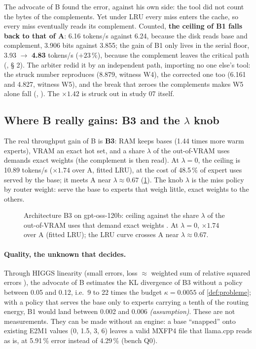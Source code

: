 The advocate of B found the error, against his own side: the tool did not count the bytes of the complements. Yet under LRU every miss enters the cache, so every miss eventually reads its complement. Counted, \textbf{the ceiling of B1 falls back to that of A}: 6.16 tokens/s against 6.24, because the disk reads base and complement, 3.906 bits against 3.855; the gain of B1 only lives in the serial floor, 3.93 $\to$ \textbf{4.83} tokens/s ($+23\,\%$), because the complement leaves the critical path \calc{} (, § 2). The arbiter redid it by an independent path, importing no one else's tool: the struck number reproduces (8.879, witness W4), the corrected one too (6.161 and 4.827, witness W5), and the break that zeroes the complements makes W5 alone fall \calc{} (, ). The $\times 1.42$ is struck out in study 07 itself.

\subsection{Where B really gains: B3 and the \texorpdfstring{$\lambda$}{lambda} knob}

The real throughput gain of B is \textbf{B3}: RAM keeps bases (1.44 times more warm experts), VRAM an exact hot set, and a share $\lambda$ of the out-of-VRAM uses demands exact weights (the complement is then read). At $\lambda = 0$, the ceiling is 10.89 tokens/s ($\times 1.74$ over A, fitted LRU), at the cost of 48.5\,\% of expert uses served by the base; it meets A near $\lambda \approx 0.67$ (\cref{fig:b3-lambda}). The knob $\lambda$ is the miss policy by router weight: serve the base to experts that weigh little, exact weights to the others.

\begin{figure}[ht]
\centering
\GrapheBtroisLambda
\caption[B3: throughput against exactness]{Architecture B3 on gpt-oss-120b: ceiling against the share $\lambda$ of the out-of-VRAM uses that demand exact weights \calc. At $\lambda = 0$, $\times 1.74$ over A (fitted LRU); the LRU curve crosses A near $\lambda \approx 0.67$.}
\label{fig:b3-lambda}
\end{figure}

\paragraph{Quality, the unknown that decides.} Through HIGGS linearity (small errors, loss $\approx$ weighted sum of relative squared errors \litt), the advocate of B estimates the KL divergence of B3 without a policy between 0.05 and 0.12, i.e.\ 9 to 22 times the budget $\kappa = 0.0055$ of \cref{def:probleme}; with a policy that serves the base only to experts carrying a tenth of the routing energy, B1 would land between 0.002 and 0.006 \emph{(assumption)}. These are not measurements. They can be made without an engine: a base ``snapped'' onto existing E2M1 values (0, 1.5, 3, 6) leaves a valid MXFP4 file that llama.cpp reads as is, at 5.91\,\% error instead of 4.29\,\% (bench Q0).

